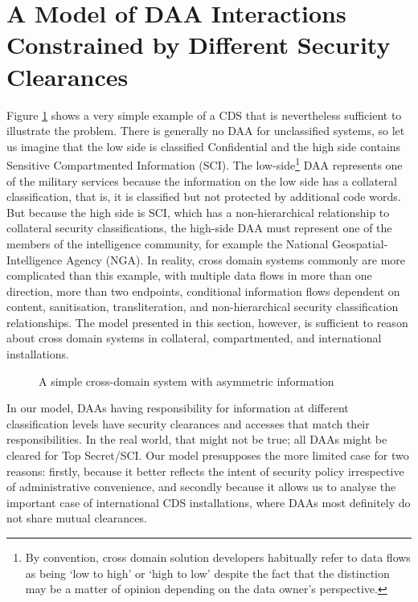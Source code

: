\documentclass{llncs}
\begin{document}
\section{A Model of DAA Interactions Constrained by Different Security Clearances}

Figure \ref{figure:simplest-possible-CDS} shows a very simple example of
a CDS that is nevertheless sufficient to illustrate the problem.
There is generally no DAA for unclassified systems, so let us imagine that the
low side is classified Confidential and the high side contains Sensitive Compartmented
Information (SCI).
The low-side\footnote{By convention, cross domain solution developers habitually
refer to data flows as being `low to high' or `high to low' despite the
fact that the distinction may be a matter of opinion depending on the data
owner's perspective.} DAA represents one of the military services because the information
on the low side has a collateral classification, that is, it is classified but not
protected by additional code words.  But because the high side is SCI,
which has a non-hierarchical relationship to collateral security classifications,
the high-side DAA must represent one of the members of the intelligence
community, for example the National Geospatial-Intelligence Agency (NGA).
In reality, cross domain systems commonly are more complicated than this example,
with multiple data flows in more than one direction, more than two endpoints,
conditional information flows dependent on content, sanitisation, transliteration,
and non-hierarchical security classification relationships.  The model presented
in this section, however, is sufficient to reason about cross domain systems in
collateral, compartmented, and international installations.

\begin{figure}[htbp]
    \caption{A simple cross-domain system with asymmetric information}
    \label{figure:simplest-possible-CDS}
\end{figure}

In our model, DAAs having responsibility for information at different
classification levels have security clearances and accesses that match
their responsibilities.  In the real world, that might not be true; all
DAAs might be cleared for Top Secret/SCI.  Our model presupposes the more
limited case for two reasons: firstly, because it better reflects the
intent of security policy irrespective of administrative convenience, and
secondly because it allows us to analyse the important case of international
CDS installations, where DAAs most definitely do not share mutual clearances.
\end{document}
